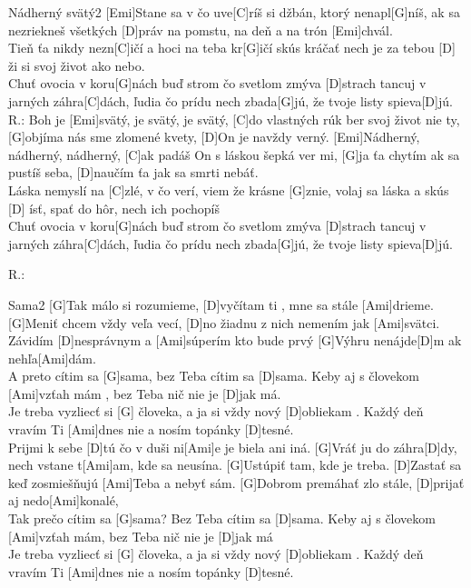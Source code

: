 \documentclass[12pt]{article}
\begin{document}
\begin{song}{Nádherný svätý}{2}
	[Emi]Stane sa v čo uve[C]ríš
	si džbán, ktorý nenapl[G]níš,
	ak sa nezriekneš všetkých [D]práv
	na pomstu, na deň a na trón [Emi]chvál.
	\\
	Tieň ťa nikdy nezn[C]ičí
	a hoci na teba kr[G]ičí
	skús kráčať nech je za tebou
	[D] ži si svoj život ako nebo.
	\\
	[C]Chuť ovocia v koru[G]nách
	buď strom čo svetlom zmýva [D]strach
	tancuj v jarných záhra[C]dách,
	ľudia čo prídu nech zbada[G]jú, 
	že tvoje listy spieva[D]jú.
	\\
	R.: Boh je [Emi]svätý, je svätý, je svätý,
	[C]do vlastných rúk ber svoj život nie ty,
	[G]objíma nás sme zlomené kvety,
	[D]On je navždy verný.
	[Emi]Nádherný, nádherný, nádherný,
	[C]ak padáš On s láskou šepká ver mi,
	[G]ja ťa chytím ak sa pustíš seba,
	[D]naučím ťa jak sa smrti nebáť.
	\\
	[Emi]Láska nemyslí na [C]zlé,
	v čo verí, viem že krásne [G]znie,
	volaj sa láska a skús [D] ísť,
	spať do hôr, nech ich pochopíš
	\\
	[C]Chuť ovocia v koru[G]nách
	buď strom čo svetlom zmýva [D]strach
	tancuj v jarných záhra[C]dách,
	ľudia čo prídu nech zbada[G]jú, 
	že tvoje listy spieva[D]jú.
	
	R.:
\end{song}

\begin{song}{Sama}{2}
	[G]Tak málo si rozumieme,
	[D]vyčítam ti , mne sa stále [Ami]drieme.
	[G]Meniť chcem vždy veľa vecí,
	[D]no žiadnu z nich nemením jak [Ami]svätci.
	\\
	[G]Závidím [D]nesprávnym 
	a [Ami]súperím kto bude prvý
	[G]Výhru nenájde[D]m ak nehľa[Ami]dám.
	\\
	A preto cítim sa [G]sama,
	bez Teba cítim sa [D]sama.
	Keby aj s človekom [Ami]vzťah mám ,
	bez Teba nič nie je [D]jak má.
	\\
	Je treba vyzliecť si [G] človeka,
	a ja si vždy nový [D]obliekam .
	Každý deň vravím Ti [Ami]dnes nie
	a nosím topánky [D]tesné.
	\\
	[G]Prijmi k sebe [D]tú čo v duši ni[Ami]e
	je biela ani iná.
	[G]Vráť ju do záhra[D]dy, nech vstane t[Ami]am, 
	kde sa neusína.
	[G]Ustúpiť tam, kde je treba.
	[D]Zastať sa keď zosmiešňujú [Ami]Teba 
	a nebyť sám.
	[G]Dobrom premáhať zlo stále, [D]prijať aj
	nedo[Ami]konalé,
	\\
	Tak prečo cítim sa [G]sama?
	Bez Teba cítim sa [D]sama.
	Keby aj s človekom [Ami]vzťah mám, 
	bez Teba nič nie je [D]jak má
	\\
	Je treba vyzliecť si [G] človeka,
	a ja si vždy nový [D]obliekam .
	Každý deň vravím Ti [Ami]dnes nie
	a nosím topánky [D]tesné.
\end{song}
\end{document}
